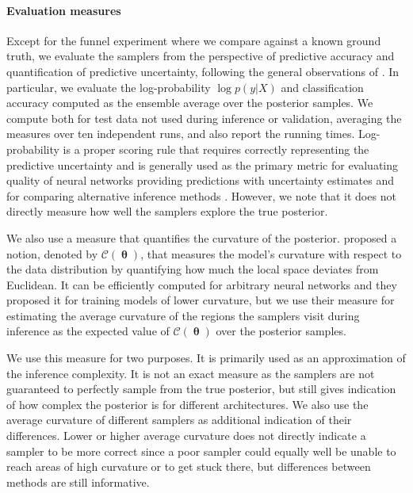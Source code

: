 \documentclass[10pt]{article} %
\DeclareMathOperator{\btheta}{\boldsymbol{\theta}}
\theoremstyle{plain}
\theoremstyle{definition}
\theoremstyle{remark}
\begin{document}
\paragraph{Evaluation measures}

Except for the funnel experiment where we compare against a known ground truth, we evaluate the samplers from the perspective of predictive accuracy and quantification of predictive uncertainty, following the general observations of \citet{Wilson2020}. In particular, we evaluate the log-probability $\log p(y|X)$ and classification accuracy computed as the ensemble average over the posterior samples. We compute both for test data not used during inference or validation, averaging the measures over ten independent runs, and also report the running times. Log-probability is a proper scoring rule \citep{Gneiting2007} that requires correctly representing the predictive uncertainty and is generally used as the primary metric for evaluating quality of neural networks providing predictions with uncertainty estimates \citep{Lakshminarayanan2017,Tran2022} and for comparing alternative inference methods \citep{Zhang2020}. However, we note that it does not directly measure how well the samplers explore the true posterior.

We also use a measure that quantifies the curvature of the posterior.
\citet{Srinivas2022} proposed a notion, denoted by $\mathcal{C}(\btheta)$, that measures the model's curvature with respect to the data distribution by quantifying how much the local space deviates from Euclidean. It can be efficiently computed for arbitrary neural networks and they proposed it for training models of lower curvature, but we use their measure for estimating the average curvature of the regions the samplers visit during inference as the expected value of $\mathcal{C}(\btheta)$ over the posterior samples.

We use this measure for two purposes. It is primarily used as an approximation of the inference complexity. It is not an exact measure as the samplers are not guaranteed to perfectly sample from the true posterior, but still gives indication of how complex the posterior is for different architectures. We also use the average curvature of different samplers as additional indication of their differences. Lower or higher average curvature does not directly indicate a sampler to be more correct since a poor sampler could equally well be unable to reach areas of high curvature or to get stuck there, but differences between methods are still informative.
\end{document}

